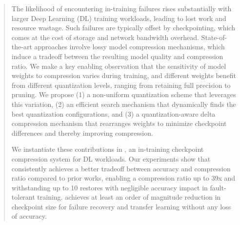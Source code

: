 \begin{abstract}
The likelihood of encountering in-training failures rises substantially with larger Deep Learning (DL) training workloads, leading to lost work and resource wastage. Such failures are typically offset by checkpointing, which comes at the cost of storage and network bandwidth overhead. State-of-the-art approaches involve lossy model compression mechanisms, which induce a tradeoff between the resulting model quality and compression ratio.
We make a key enabling observation that the sensitivity of model weights to compression varies during training, and different weights benefit from different quantization levels, ranging from retaining full precision to pruning. 
We propose (1) a non-uniform quantization scheme that leverages this variation, 
(2) an efficient search mechanism that dynamically finds the best quantization configurations, and
(3) a quantization-aware delta compression mechanism that rearranges weights to minimize checkpoint differences and thereby improving compression.

We instantiate these contributions in \sys, an in-training checkpoint compression system for DL workloads. Our experiments show that \sys consistently achieves a better tradeoff between accuracy and compression ratio compared to prior works, enabling a compression ratio up to 39x and withstanding up to 10 restores with negligible accuracy impact in fault-tolerant training. \sys achieves at least an order of magnitude reduction in checkpoint size for failure recovery and transfer learning without any loss of accuracy.



\end{abstract}
